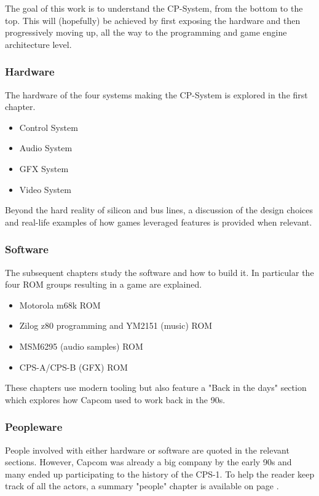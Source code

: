 The goal of this work is to understand the CP-System, from the bottom to the top. This will (hopefully) be achieved by first exposing the hardware and then progressively moving up, all the way to the programming and game engine architecture level.

\subsubsection{Hardware}
The hardware of the four systems making the CP-System is explored in the first chapter.
\begin{itemize}[topsep=0pt]
\item Control System
\item Audio System
\item GFX System
\item Video System
\end{itemize}
 Beyond the hard reality of silicon and bus lines, a discussion of the design choices and real-life examples of how games leveraged features is provided when relevant.


\subsubsection{Software}
The subsequent chapters study the software and how to build it. In particular the four ROM groups resulting in a game are explained. 

\begin{itemize}[topsep=0pt]
\item Motorola m68k ROM
\item Zilog z80 programming and YM2151 (music) ROM
\item MSM6295 (audio samples) ROM
\item CPS-A/CPS-B (GFX) ROM
\end{itemize}

These chapters use modern tooling but also feature a "Back in the days" section which explores how Capcom used to work back in the 90s.

\subsubsection{Peopleware}
People involved with either hardware or software are quoted in the relevant sections. However, Capcom was already a big company by the early 90s and many ended up participating to the history of the CPS-1. To help the reader keep track of all the actors, a summary "people" chapter is available on page \pageref{people}.
